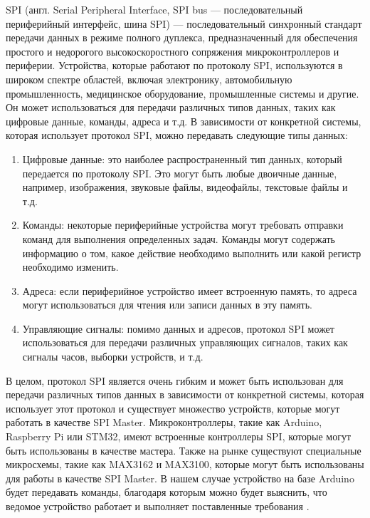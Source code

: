 \documentclass[14pt, oneside]{altsu-report}
\begin{document}
	SPI (англ. Serial Peripheral Interface, SPI bus — последовательный периферийный интерфейс, шина SPI) — последовательный синхронный стандарт передачи данных в режиме полного дуплекса, предназначенный для обеспечения простого и недорогого высокоскоростного сопряжения микроконтроллеров и периферии. Устройства, которые работают по протоколу SPI, используются в широком спектре областей, включая электронику, автомобильную промышленность, медицинское оборудование, промышленные системы и другие. Он может использоваться для передачи различных типов данных, таких как цифровые данные, команды, адреса и т.д. В зависимости от конкретной системы, которая использует протокол SPI, можно передавать следующие типы данных:
	\begin{enumerate}
		\item Цифровые данные: это наиболее распространенный тип данных, который передается по протоколу SPI. Это могут быть любые двоичные данные, например, изображения, звуковые файлы, видеофайлы, текстовые файлы и т.д.
		\item Команды: некоторые периферийные устройства могут требовать отправки команд для выполнения определенных задач. Команды могут содержать информацию о том, какое действие необходимо выполнить или какой регистр необходимо изменить.
		\item Адреса: если периферийное устройство имеет встроенную память, то адреса могут использоваться для чтения или записи данных в эту память.
		\item Управляющие сигналы: помимо данных и адресов, протокол SPI может использоваться для передачи различных управляющих сигналов, таких как сигналы часов, выборки устройств, и т.д.
	\end{enumerate}	 
	
	В целом, протокол SPI является очень гибким и может быть использован для передачи различных типов данных в зависимости от конкретной системы, которая использует этот протокол и существует множество устройств, которые могут работать в качестве SPI Master. Микроконтроллеры, такие как Arduino, Raspberry Pi или STM32, имеют встроенные контроллеры SPI, которые могут быть использованы в качестве мастера. Также на рынке существуют специальные микросхемы, такие как MAX3162 и MAX3100, которые могут быть использованы для работы в качестве SPI Master. В нашем случае устройство на базе Arduino будет передавать команды, благодаря которым можно будет выяснить, что ведомое устройство работает и выполняет поставленные требования \cite{felker2010android} \cite{wikiRUGitHub}.	
\end{document}

